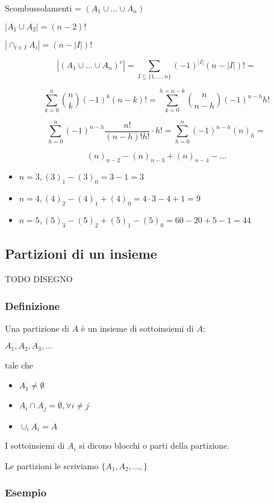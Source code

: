 \documentclass[11pt]{article}
\begin{document}
		Scombussolamenti = $(A_1 \cup \ldots \cup A_n)$

		$|A_1 \cup A_2| = (n-2)!$

		$|\cap_{i \in I} A_i| = (n-|I|)!$
		
	\[
		|(A_1 \cup \ldots \cup A_n)^{c}| = 
		\sum_{I \subseteq \{1,\ldots,n\}} (-1)^{|I|}(n-|I|)! =
	\]

	\[
		\sum_{k=0}^{n}\binom{n}{k}(-1)^{k}(n-k)! = 
		\sum_{k=0}^{h=n-k}\binom{n}{n-h}(-1)^{n-h}h!
	\]

	\[
		\sum_{h=0}^{n}(-1)^{n-h} \frac{n!}{(n-h)!h!} \cdot h! =
		\sum_{h=0}^{n}(-1)^{n-h}(n)_h =
	\]

	\[
		(n)_{n-2} - (n)_{n-3} + (n)_{n-4} - \ldots	
	\]
		\begin{itemize}
			\item $n=3 , (3)_1 - (3)_0 = 3 - 1 = 3$
			\item $n=4, (4)_2 - (4)_1 + (4)_0 = 4 \cdot 3 - 4 + 1 = 9$
			\item $n=5, (5)_3 - (5)_2 + (5)_1 - (5)_0 = 60 - 20 + 5 - 1 = 44$
		\end{itemize}
		
		\subsection{Partizioni di un insieme}

		TODO DISEGNO

		\subsubsection{Definizione}

		Una partizione di $A$ \`e un insieme di sottoinsiemi di $A$:

		$A_1,A_2,A_3,\ldots$

		tale che 

		\begin{itemize}
			\item $A_1 \neq \emptyset$
			\item $A_i \cap A_j = \emptyset, \forall i \neq j$
			\item $\cup_i A_i = A$
		\end{itemize}

		I sottoinsiemi di $A_i$ si dicono blocchi o parti della partizione.

		Le partizioni le scriviamo $\{A_1,A_2,\ldots,\}$

		\subsubsection{Esempio}
\end{document}
